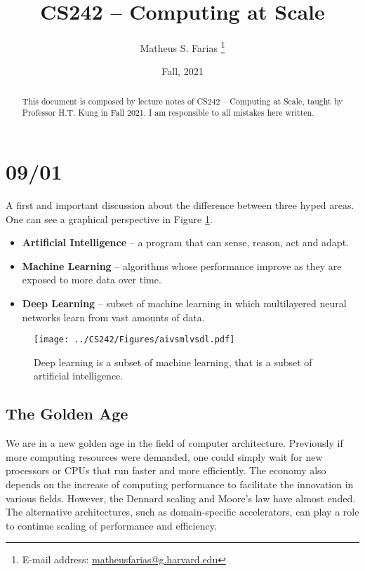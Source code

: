 \documentclass[abstract=true]{scrartcl}
\begin{document}
\title{CS242 -- Computing at Scale}
\date{Fall, 2021}

\author{Matheus S. Farias%
  \thanks{E-mail address: \href{mailto:matheusfarias@g.harvard.edu}{matheusfarias@g.harvard.edu}}}

\maketitle

\begin{abstract}
    This document is composed by lecture notes of CS242 -- Computing at Scale, taught by Professor H.T. Kung in Fall 2021. I am responsible to all mistakes here written.
\end{abstract}

\tableofcontents

\section{09/01}
A first and important discussion about the difference between three hyped areas. One can see a graphical perspective in Figure  \ref{fig:aivsmlvsdl}.  
\begin{itemize}
    \item \textbf{Artificial Intelligence} -- a program that can sense, reason, act and adapt.
    \item \textbf{Machine Learning} -- algorithms whose performance improve as they are exposed to more data over time.
    \item \textbf{Deep Learning} -- subset of machine learning in which multilayered neural networks learn from vast amounts of data.
\end{itemize}

\begin{figure}
    \centering
    \texttt{[image: ../CS242/Figures/aivsmlvsdl.pdf]}
    \caption{Deep learning is a subset of machine learning, that is a subset of artificial intelligence.}
    \label{fig:aivsmlvsdl}
\end{figure}

\subsection{The Golden Age}
We are in a new golden age in the field of computer architecture. Previously if more computing resources were demanded, one could simply wait for new processors or CPUs that run faster and more efficiently. The economy also depends on the increase of computing performance to facilitate the innovation in various fields. However, the Dennard scaling and Moore’s law have almost ended. The alternative architectures, such as domain-specific accelerators, can play a role to continue scaling of performance and efficiency.
\end{document}
